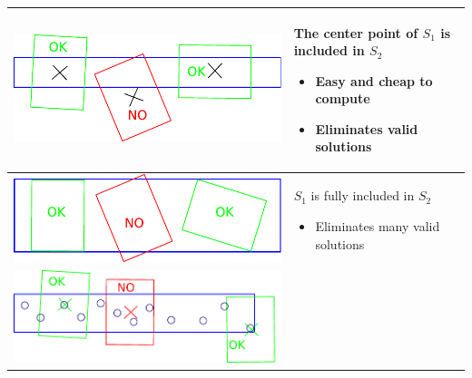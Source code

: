 \begin{table}[ht!]
  \centering
  \begin{tabular}{c m{8cm}}
    \toprule
    \begin{minipage}{.4\textwidth}
      \includegraphics[width=0.9\linewidth]{contact1.pdf}
    \end{minipage}
    &
    The center point of $S_1$ is included
    in $S_2$
    \begin{itemize}
      \item Easy and cheap to compute
      \item Eliminates valid solutions
    \end{itemize}
    \\ \midrule
    \begin{minipage}{.4\textwidth}
      \includegraphics[width=0.8\linewidth]{contact2.pdf}
    \end{minipage}
    &
    $S_1$ is fully included in $S_2$
    \begin{itemize}
      \item Eliminates many valid solutions
    \end{itemize}
    \\ \midrule
    \begin{minipage}{.4\textwidth}
      \includegraphics[width=\linewidth]{contact3.pdf}

\end{minipage}
\end{tabular}
\end{table}
